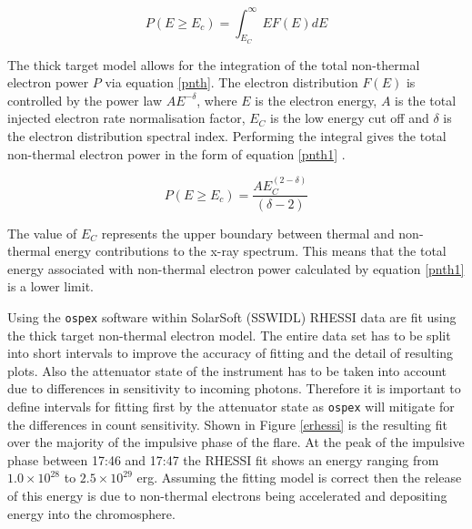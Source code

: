\begin{equation}\label{pnth}
P(E \geq E_{c}) = \int_{E_{C}}^{\infty} EF(E)dE
\end{equation}

The thick target model allows for the integration of the total non-thermal electron power $P$ via equation \ref{pnth}. The electron distribution $F(E)$ is controlled by the power law $AE^{-\delta}$, where $E$ is the electron energy, $A$ is the total injected electron rate normalisation factor, $E_{C}$ is the low energy cut off and $\delta$ is the electron distribution spectral index.   
Performing the integral gives the total non-thermal electron power in the form of equation \ref{pnth1} .

\begin{equation}\label{pnth1}
P(E \geq E_{c}) = \frac{AE_{C}^{(2-\delta)}}{(\delta - 2)}
\end{equation}

The value of $E_{C}$ represents the upper boundary between thermal and non-thermal energy contributions to the x-ray spectrum. This means that the total energy associated with non-thermal electron power calculated by equation \ref{pnth1} is a lower limit.
  
Using the \texttt{ospex} software within SolarSoft (SSWIDL) RHESSI data are fit using the thick target non-thermal electron model. The entire data set has to be split into short intervals to improve the accuracy of fitting and the detail of resulting plots. Also the attenuator state of the instrument has to be taken into account due to differences in sensitivity to incoming photons. Therefore it is important to define intervals for fitting first by the attenuator state as \texttt{ospex} will mitigate for the differences in count sensitivity. Shown in Figure \ref{erhessi} is the resulting fit over the majority of the impulsive phase of the flare. At the peak of the impulsive phase between 17:46 and 17:47 the RHESSI fit shows an energy ranging from $1.0{\times}10^{28}$ to $2.5{\times}10^{29}$ erg. Assuming the fitting model is correct then the release of this energy is due to non-thermal electrons being accelerated and depositing energy into the chromosphere. 

